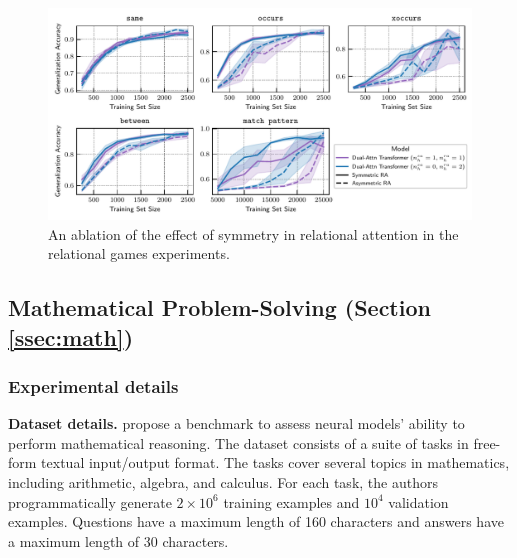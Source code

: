 \begin{figure}[h]
    \centering
    \includegraphics[width=\textwidth]{figs/experiments/relgames/relgames_learning_curves_symmetry_ablation.pdf}
    \caption{An ablation of the effect of symmetry in relational attention in the relational games experiments.}\label{fig:relgames_symmetry_ablation}
\end{figure}

\subsection{Mathematical Problem-Solving (Section \ref{ssec:math})}\label{ssec:appendix_math}

\subsubsection*{Experimental details}

\textbf{Dataset details.} \citet{saxtonAnalyzingMathematicalReasoning2019} propose a benchmark to assess neural models' ability to perform mathematical reasoning. The dataset consists of a suite of tasks in free-form textual input/output format. The tasks cover several topics in mathematics, including arithmetic, algebra, and calculus. For each task, the authors programmatically generate $2 \times 10^6$ training examples and $10^4$ validation examples. Questions have a maximum length of 160 characters and answers have a maximum length of 30 characters.


